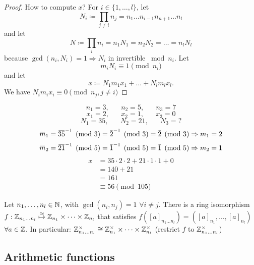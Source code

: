 \documentclass[NumTh.tex]{subfiles}
\begin{document}
\begin{proof}
How to compute $x$? For $i \in \{1,\dots,l\}$, let
\[ N_i \coloneq \prod_{j \neq i} n_j = n_1 \dots n_{i-1} n_{n+1} \dots n_l \]
and let
\[ N \coloneq \prod_i n_i = n_1 N_1 = n_2 N_2 = \dots = n_l N_l \]
because $\gcd(n_i,N_i) = 1 \Rightarrow N_i$ in invertible $\bmod n_i$. Let
\[ m_i N_i \equiv 1 \pmod{n_i} \]
and let
\[ x \coloneq N_1 m_1 x_1 + \dots + N_l m_l x_l \text{.} \]
We have $N_i m_i x_i \equiv 0 \pmod{n_j, j\neq i}$%
\end{proof}

\begin{ex}
  \[
    n_1 = 3, \hspace{20pt} n_2 = 5, \hspace{20pt} n_3 = 7
  \] \[
    x_1 = 2, \hspace{20pt} x_2 = 1, \hspace{20pt} x_3 = 0
  \] \[
    N_1 = 35, \hspace{20pt} N_2 = 21, \hspace{20pt} N_3 = ?
  \]
  \[ \overbar{m}_1 = \inv{\overbar{35}} \pmod{3} = \inv{\overbar{2}} \pmod{3} = \overbar{2} \pmod{3} \Rightarrow m_1 = 2 \]
  \[ \overbar{m}_2 = \inv{\overbar{21}} \pmod{5} = \inv{\overbar{1}} \pmod{5} = \overbar{1} \pmod{5} \Rightarrow m_2 = 1 \]
  \begin{align*}
    x &= 35 \cdot 2 \cdot 2 + 21 \cdot 1 \cdot 1 + 0 \\
      &= 140 + 21 \\
      &= 161 \\
      &\equiv 56 \pmod{105}
  \end{align*}
\end{ex}

\begin{ex}
  Let $n_1,\dots,n_l \in \mathbb{N}$, with $\gcd(n_i,n_j)= 1$ $\forall i \neq j$.
  There is a ring isomorphism $f: \mathbb{Z}_{n_1 \dots n_l} \overset{\simeq}{\mapsto} \mathbb{Z}_{n_1} \times \dots \times \mathbb{Z}_{n_l}$ that satisfies
  $f([a]_{n_1 \dots n_l}) = ([a]_{n_1},\dots,[a]_{n_l})$ $\forall a \in \mathbb{Z}$.
  In particular: $\mathbb{Z}_{n_1 \dots n_l}^\times \cong \mathbb{Z}_{n_1}^\times \times \dots \times \mathbb{Z}_{n_l}^\times$ (restrict $f$ to $\mathbb{Z}_{n_1 \dots n_l}^\times$)
\end{ex}


\subsection{Arithmetic functions}
\end{document}
